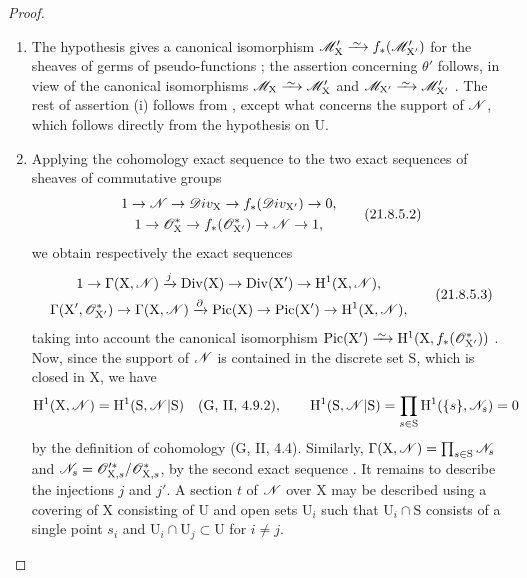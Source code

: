 \begin{proof}
\begin{enumerate}[label=(\roman*)]
  \item The hypothesis gives a canonical isomorphism $\sh{M}'_\mathrm{X}\simto f_*(\sh{M}'_{\mathrm{X}'})$ for the sheaves of germs of pseudo-functions ; the assertion concerning $\theta'$ follows, in view of the canonical isomorphisms $\sh{M}_\mathrm{X}\simto\sh{M}'_\mathrm{X}$ and $\sh{M}_{\mathrm{X}'}\simto\sh{M}'_{\mathrm{X}'}$ .
The rest of assertion (i) follows from , except what concerns the support of $\mathscr{N}$, which follows directly from the hypothesis on $\mathrm{U}$.

  \item Applying the cohomology exact sequence to the two exact sequences of sheaves of commutative groups
\[
\label{IV.21.8.5.2}
\begin{gathered}
  1\to\mathscr{N}\to\mathscr{D}iv_\mathrm{X}\to f_*(\mathscr{D}iv_{\mathrm{X}'})\to 0,\\
  1\to\mathscr{O}^*_\mathrm{X}\to f_*(\mathscr{O}^*_{\mathrm{X}'})\to\mathscr{N}\to 1,
\end{gathered}
  \tag{21.8.5.2}
\]
we obtain respectively the exact sequences
\[
\label{IV.21.8.5.3}
\begin{gathered}
  1\to\Gamma(\mathrm{X},\mathscr{N})\xrightarrow{j}\operatorname{Div}(\mathrm{X})\to\operatorname{Div}(\mathrm{X}')\to\mathrm{H}^1(\mathrm{X},\mathscr{N}),\\
  \Gamma(\mathrm{X}',\mathscr{O}^*_{\mathrm{X}'})\to\Gamma(\mathrm{X},\mathscr{N})\xrightarrow{\partial}\operatorname{Pic}(\mathrm{X})\to\operatorname{Pic}(\mathrm{X}')\to\mathrm{H}^1(\mathrm{X},\mathscr{N}),
\end{gathered}
  \tag{21.8.5.3}
\]
taking into account the canonical isomorphism $\operatorname{Pic}(\mathrm{X}')\simto\HH^1(\mathrm{X},f_*(\sh{O}^*_{\mathrm{X}'}))$ .
Now, since the support of $\mathscr{N}$ is contained in the discrete set $\mathrm{S}$, which is closed in $\mathrm{X}$, we have
\[
  \mathrm{H}^1(\mathrm{X},\mathscr{N})=\mathrm{H}^1(\mathrm{S},\mathscr{N}|\mathrm{S}) \quad\text{(G, II, 4.9.2)},
  \qquad
  \mathrm{H}^1(\mathrm{S},\mathscr{N}|\mathrm{S})=\prod_{s\in\mathrm{S}}\mathrm{H}^1(\{s\},\mathscr{N}_s)=0
\]
by the definition of cohomology (G, II, 4.4).
Similarly, $\Gamma(\mathrm{X},\mathscr{N})=\prod_{s\in\mathrm{S}}\mathscr{N}_s$ and $\mathscr{N}_s=\mathscr{O}'^{*}_{\mathrm{X},s}/\mathscr{O}^*_{\mathrm{X},s}$, by the second exact sequence .
It remains to describe the injections $j$ and $j'$.
A section $t$ of $\mathscr{N}$ over $\mathrm{X}$ may be described using a covering of $\mathrm{X}$ consisting of $\mathrm{U}$ and open sets $\mathrm{U}_i$ such that $\mathrm{U}_i\cap\mathrm{S}$ consists of a single point $s_i$ and $\mathrm{U}_i\cap\mathrm{U}_j\subset\mathrm{U}$ for $i\neq j$.

\end{enumerate}
\end{proof}

